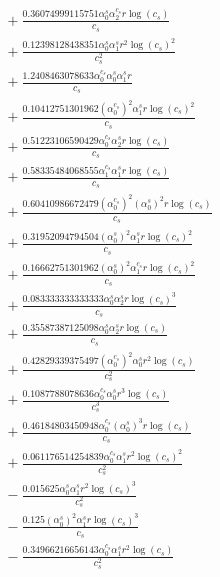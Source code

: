 \documentclass[10pt]{article}
\begin{document}
\begin{align*}
&{}  + \frac{0.36074999115751 \alpha_{0}^s \alpha_{2}^{c_s} r \log{\left(c_{s} \right)}}{c_{s}} \\
&{}  + \frac{0.12398128438351 \alpha_{0}^s \alpha_{1}^s r^{2} \log{\left(c_{s} \right)}^{2}}{c_{s}^{2}} \\
&{}  + \frac{1.2408463078633 \alpha_{0}^{c_s} \alpha_{0}^s \alpha_{1}^s r}{c_{s}} \\
&{}  + \frac{0.10412751301962 \left(\alpha_{0}^{c_s}\right)^{2} \alpha_{1}^s r \log{\left(c_{s} \right)}^{2}}{c_{s}} \\
&{}  + \frac{0.51223106590429 \alpha_{0}^{c_s} \alpha_{2}^s r \log{\left(c_{s} \right)}}{c_{s}} \\
&{}  + \frac{0.58335484068555 \alpha_{1}^{c_s} \alpha_{1}^s r \log{\left(c_{s} \right)}}{c_{s}} \\
&{}  + \frac{0.60410986672479 \left(\alpha_{0}^{c_s}\right)^{2} \left(\alpha_{0}^s\right)^{2} r \log{\left(c_{s} \right)}}{c_{s}} \\
&{}  + \frac{0.31952094794504 \left(\alpha_{0}^s\right)^{2} \alpha_{1}^s r \log{\left(c_{s} \right)}^{2}}{c_{s}} \\
&{}  + \frac{0.16662751301962 \left(\alpha_{0}^s\right)^{2} \alpha_{1}^{c_s} r \log{\left(c_{s} \right)}^{2}}{c_{s}} \\
&{}  + \frac{0.083333333333333 \alpha_{0}^s \alpha_{2}^s r \log{\left(c_{s} \right)}^{3}}{c_{s}} \\
&{}  + \frac{0.35587387125098 \alpha_{0}^s \alpha_{2}^s r \log{\left(c_{s} \right)}}{c_{s}} \\
&{}  + \frac{0.42829339375497 \left(\alpha_{0}^{c_s}\right)^{2} \alpha_{0}^s r^{2} \log{\left(c_{s} \right)}}{c_{s}^{2}} \\
&{}  + \frac{0.1087788078636 \alpha_{0}^{c_s} \alpha_{0}^s r^{3} \log{\left(c_{s} \right)}}{c_{s}^{3}} \\
&{}  + \frac{0.46184803450948 \alpha_{0}^{c_s} \left(\alpha_{0}^s\right)^{3} r \log{\left(c_{s} \right)}}{c_{s}} \\
&{}  + \frac{0.061176514254839 \alpha_{0}^{c_s} \alpha_{1}^s r^{2} \log{\left(c_{s} \right)}^{2}}{c_{s}^{2}} \\
&{}  - \frac{0.015625 \alpha_{0}^s \alpha_{1}^s r^{2} \log{\left(c_{s} \right)}^{3}}{c_{s}^{2}} \\
&{}  - \frac{0.125 \left(\alpha_{0}^s\right)^{2} \alpha_{1}^s r \log{\left(c_{s} \right)}^{3}}{c_{s}} \\
&{}  - \frac{0.34966216656143 \alpha_{0}^{c_s} \alpha_{1}^s r^{2} \log{\left(c_{s} \right)}}{c_{s}^{2}} \\

\end{align*}
\end{document}
